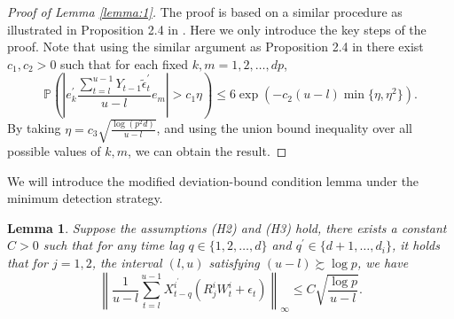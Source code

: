 \documentclass[11pt]{article}
\newtheorem{lemma}{Lemma}[section]
\begin{document}
\begin{proof}[Proof of Lemma \ref{lemma:1}]
The proof is based on a similar procedure as illustrated in Proposition 2.4 in \cite{basu2015regularized}. Here we only introduce the key steps of the proof. Note that using the similar argument as Proposition 2.4 in \cite{basu2015regularized} there exist $c_1, c_2>0$ such that for each fixed $k,m = 1,2,\dots, dp$, 
\begin{equation*}
    \mathbb{P}\left(\left| e_k^\prime\frac{\sum_{t=l}^{u-1}Y_{t-1}\widetilde{\epsilon}_t^\prime}{u-l}e_m \right| > c_1\eta \right) \leq 6\exp(-c_2(u-l)\min\{\eta, \eta^2\}).
\end{equation*}
By taking $\eta = c_3\sqrt{\frac{\log (p^2d)}{u-l}}$, and using the union bound inequality over all possible values of $k, m$, we can obtain the result.
\end{proof}


We will introduce the modified deviation-bound condition lemma under the minimum detection strategy.  
\begin{lemma}
\label{lemma:2}
Suppose the assumptions (H2) and (H3) hold, there exists a constant $C > 0$ such that for any time lag $q \in \{1,2,\dots, d\}$ and $q^\prime \in \{d+1, \dots, d_i\}$, it holds that for $j=1,2$, the interval $(l, u)$ satisfying $(u-l) \succsim \log p$, we have
\begin{equation*}
    \left\| \frac{1}{u-l}\sum_{t=l}^{u-1}X_{t-q}^{i^\prime}\left( R_j^iW_t^i + \epsilon_t \right) \right\|_\infty \leq C\sqrt{\frac{\log p}{u-l}}.
\end{equation*}
\end{lemma}
\end{document}
